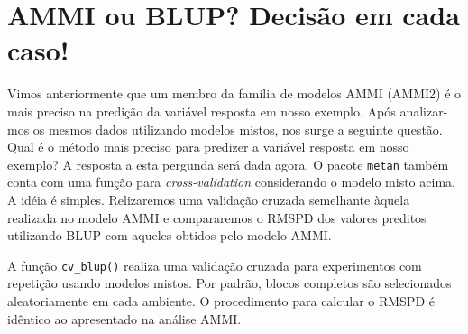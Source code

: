 \documentclass[
]{book}
\newenvironment{Shaded}{\begin{snugshade}}{\end{snugshade}}
\newcommand{\CommentTok}[1]{\textcolor[rgb]{0.56,0.35,0.01}{\textit{#1}}}
\newcommand{\KeywordTok}[1]{\textcolor[rgb]{0.13,0.29,0.53}{\textbf{#1}}}
\newcommand{\NormalTok}[1]{#1}
\newcommand{\OperatorTok}[1]{\textcolor[rgb]{0.81,0.36,0.00}{\textbf{#1}}}
\newcommand{\StringTok}[1]{\textcolor[rgb]{0.31,0.60,0.02}{#1}}
\begin{document}
\begin{Shaded}
\end{Shaded}

\hypertarget{ammi-ou-blup-decisuxe3o-em-cada-caso}{%
\section{AMMI ou BLUP? Decisão em cada caso!}\label{ammi-ou-blup-decisuxe3o-em-cada-caso}}

Vimos anteriormente que um membro da família de modelos AMMI (AMMI2) é o mais preciso na predição da variável resposta em nosso exemplo. Após analizar-mos os mesmos dados utilizando modelos mistos, nos surge a seguinte questão. Qual é o método mais preciso para predizer a variável resposta em nosso exemplo? A resposta a esta pergunda será dada agora. O pacote \texttt{metan} também conta com uma função para \emph{cross-validation} considerando o modelo misto acima. A idéia é simples. Relizaremos uma validação cruzada semelhante àquela realizada no modelo AMMI e compararemos o RMSPD dos valores preditos utilizando BLUP com aqueles obtidos pelo modelo AMMI.

A função \texttt{cv\_blup()} realiza uma validação cruzada para experimentos com repetição usando modelos mistos. Por padrão, blocos completos são selecionados aleatoriamente em cada ambiente. O procedimento para calcular o RMSPD é idêntico ao apresentado na análise AMMI.
\end{document}
